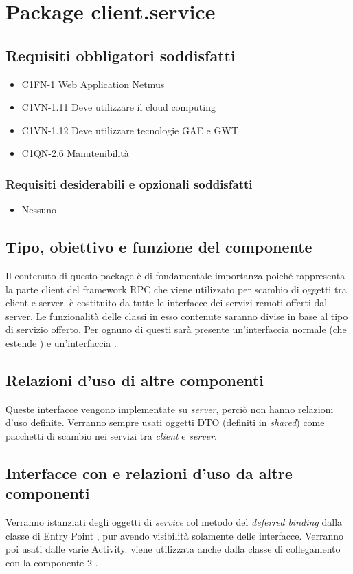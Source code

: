 \newpage
\section{Package client.service} %
\subsection*{Requisiti obbligatori soddisfatti}
\begin{itemize}
    \item C1FN-1 Web Application Netmus
    \item C1VN-1.11 Deve utilizzare il cloud computing
    \item C1VN-1.12 Deve utilizzare tecnologie GAE e GWT
    \item C1QN-2.6 Manutenibilit\`a
\end{itemize}
\subsubsection*{Requisiti desiderabili e opzionali soddisfatti}
\begin{itemize}
    \item Nessuno
\end{itemize}
\subsection*{Tipo, obiettivo e funzione del componente}
Il contenuto di questo package \`e di fondamentale importanza poich\'e
rappresenta la parte client del framework RPC che viene utilizzato per scambio
di oggetti tra client e server.  \`e costituito da tutte
le interfacce dei servizi remoti offerti dal server. Le funzionalit\`a delle
classi in esso contenute saranno divise in base al tipo di servizio offerto. Per
ognuno di questi sar\`a presente un'interfaccia normale (che estende
) e un'interfaccia .
\subsection*{Relazioni d'uso
di altre componenti} Queste interfacce vengono implementate su \emph{server}, perci\`o non
hanno relazioni d'uso definite. Verranno sempre usati oggetti DTO (definiti in
\emph{shared}) come pacchetti di scambio nei servizi tra \emph{client} e
\emph{server}.
\subsection*{Interfacce con e relazioni d'uso da altre componenti}
Verranno istanziati degli oggetti di \emph{service} col metodo del
\emph{deferred binding} dalla classe di Entry Point , pur avendo
visibilit\`a solamente delle interfacce. Verranno poi usati dalle varie Activity.
 viene utilizzata anche dalla classe di collegamento con la
componente 2 . 
